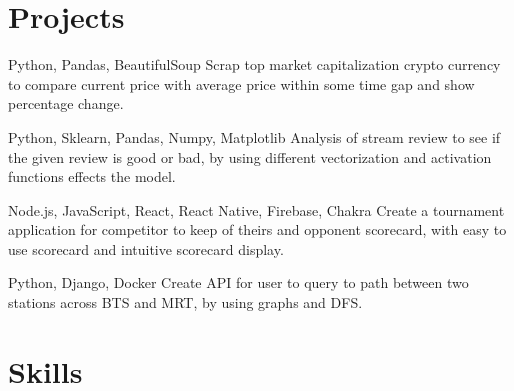 \documentclass[a4paper, extended]{comcv}
\begin{document}
\section{Projects}
{Python, Pandas, BeautifulSoup}{}{}{
  \indent Scrap top market capitalization crypto currency to compare current price
  with average price within some time gap and show percentage change.
}

{Python, Sklearn, Pandas, Numpy, Matplotlib}{}{}{
  \indent Analysis of stream review to see if the given review is good or bad,
  by using different vectorization and activation functions effects the model.
}

{Node.js, JavaScript, React, React Native, Firebase, Chakra}{}{}{
  \indent Create a tournament application for competitor to keep of theirs and
  opponent scorecard, with easy to use scorecard and intuitive scorecard display.
}

{Python, Django, Docker}{}{}{
  \indent Create API for user to query to path between two stations across BTS
  and MRT, by using graphs and DFS.
}

\vspace{\topsep}
\section{Skills}

\end{document}
